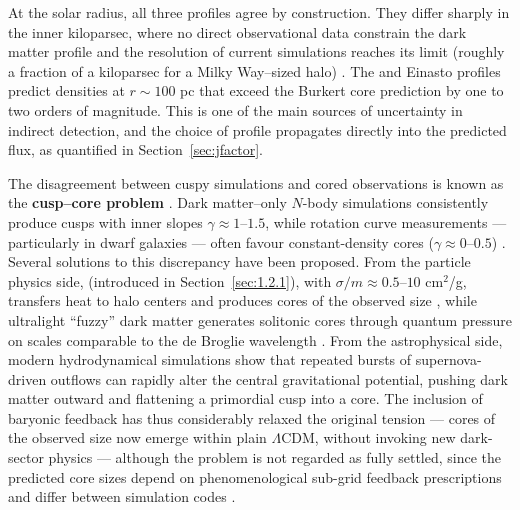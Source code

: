 At the solar radius, all three profiles agree by construction.
They differ sharply in the inner kiloparsec, where no direct observational data constrain the dark matter profile and the resolution of current simulations reaches its limit (roughly a fraction of a kiloparsec for a Milky Way--sized halo) \cite{Navarro:1996gj,Bullock:2017xww}.
The \NFW and Einasto profiles predict densities at $r \sim 100$ pc that exceed the Burkert core prediction by one to two orders of magnitude. 
This is one of the main sources of uncertainty in indirect detection, and the choice of profile propagates directly into the predicted flux, as quantified in Section~\ref{sec:jfactor}.

The disagreement between cuspy simulations and cored observations is known as the \textbf{cusp--core problem} \cite{Cirelli:2024ssz,Bullock:2017xww}.
Dark matter--only $N$-body simulations consistently produce cusps with inner slopes $\gamma \approx 1$--$1.5$, while rotation curve measurements --- particularly in dwarf galaxies --- often favour constant-density cores ($\gamma \approx 0$--$0.5$) \cite{Bullock:2017xww}.
Several solutions to this discrepancy have been proposed.
From the particle physics side, \SIDM (introduced in Section~\ref{sec:1.2.1}), with $\sigma/m \approx 0.5$--$10$ cm$^2$/g, transfers heat to halo centers and produces cores of the observed size \cite{Spergel:1999mh,Tulin:2017ara,Bullock:2017xww}, while ultralight ``fuzzy'' dark matter generates solitonic cores through quantum pressure on scales comparable to the de Broglie wavelength \cite{Hu:2000ke}.
From the astrophysical side, modern hydrodynamical simulations show that repeated bursts of supernova-driven outflows can rapidly alter the central gravitational potential, pushing dark matter outward and flattening a primordial cusp into a core.
The inclusion of baryonic feedback has thus considerably relaxed the original tension --- cores of the observed size now emerge within plain $\Lambda$CDM, without invoking new dark-sector physics --- although the problem is not regarded as fully settled, since the predicted core sizes depend on phenomenological sub-grid feedback prescriptions and differ between simulation codes \cite{Bullock:2017xww}.

